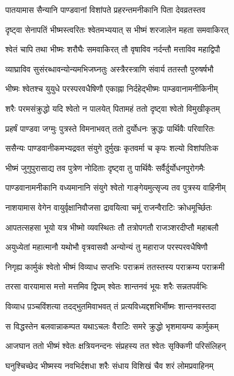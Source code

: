 \twolineshloka
{पातयामास सैन्यानि पाण्डवानां विशांपते}
{प्रहरन्तमनीकानि पिता देवव्रतस्तव}


\twolineshloka
{दृष्ट्वा सेनापतिं भीष्मस्त्वरितः श्वेतमभ्ययात्}
{स भीष्मं शरजालेन महता समवाकिरत्}


\twolineshloka
{श्वेतं चापि तथा भीष्मः शरौघैः समवाकिरत्}
{तौ वृषाविव नर्दन्तौ मत्ताविव महाद्विपौ}


\twolineshloka
{व्याघ्राविव सुसंरब्धावन्योन्यमभिजघ्नतुः}
{अस्त्रैरस्त्राणि संवार्य ततस्तौ पुरुषर्षभौ}


\twolineshloka
{भीष्मः श्वेतश्च युयुधे परस्परवधैषिणौ}
{एकाह्ना निर्दहेद्भीष्मः पाम्डवानामनीकिनीम्}


\twolineshloka
{शरैः परमसंक्रुद्धो यदि श्वेतो न पालयेत्}
{पितामहं ततो दृष्ट्वा श्वेतो विमुखीकृतम्}


\twolineshloka
{प्रहर्षं पाण्डवा जग्मुः पुत्रस्ते विमनाभवत्}
{ततो दुर्योधनः क्रुद्धः पार्थिवैः परिवारितः}


\twolineshloka
{ससैन्यः पाण्डवानीकमभ्यद्रवत संयुगे}
{दुर्मुखः कृतवर्मा च कृपः शल्यो विशांपतिःक}


\twolineshloka
{भीष्मं जुगुपुरासाद्य तव पुत्रेण नोदिताः}
{दृष्ट्वा तु पार्थिवैः सर्वैर्दुर्योधनपुरोगमैः}


\twolineshloka
{पाण्डवानामनीकानि वध्यमानानि संयुगे}
{श्वेतो गाङ्गेयमुत्सृज्य तव पुत्रस्य वाहिनीम्}


\twolineshloka
{नाशयामास वेगेन वायुर्वृक्षानिवौजसा}
{द्रावयित्वा चमूं राजन्वैराटिः क्रोधमूर्च्छितः}


\twolineshloka
{आपतत्सहसा भूयो यत्र भीष्मो व्यवस्थितः}
{तौ तत्रोपगतौ राजञ्शरदीप्तौ महाबलौ}


\twolineshloka
{अयुध्येतां महात्मानौ यथोभौ वृत्रवासवौ}
{अन्योन्यं तु महाराज परस्परवधैषिणौ}


\twolineshloka
{निगृह्य कार्मुकं श्वेतो भीष्मं विव्याध सप्तभिः}
{पराक्रमं ततस्तस्य पराक्रम्य पराक्रमी}


\twolineshloka
{तरसा वारयामास मत्तो मत्तमिव द्विपम्}
{श्वेतः शान्तनवं भूयः शरैः सन्नतपर्वभिः}


\twolineshloka
{विव्याध प़ञ्चविंशत्या तदद्भुतमिवाभवत्}
{तं प्रत्यविध्यद्दशभिर्भीष्मः शान्तनवस्तदा}


\twolineshloka
{स विद्धस्तेन बलवान्नाकम्पत यथाऽचलः}
{वैराटिः समरे क्रुद्धो भृशमायम्य कार्मुकम्}


\twolineshloka
{आजघान ततो भीष्मं श्वेतः क्षत्रियनन्दनः}
{संप्रहस्य तत श्वेतः सृक्किणी परिसंलिहन्}


\twolineshloka
{घनुश्चिच्छेद भीष्मस्य नवभिर्दशधा शरैः}
{संधाय विशिखं चैव शरं लोमप्रवाहिनम्}


